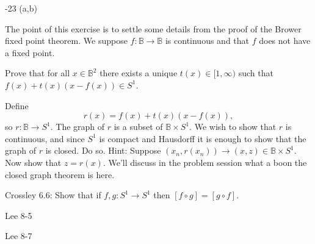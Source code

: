 \documentclass{homework651}
\newcommand{\bbB}{\mathbb{B}}
\begin{document}
\begin{problems}

-23 (a,b)

\problem The point of this exercise is to settle some details from the 
proof of the Brower fixed point theorem.  We suppose $f:\bbB\to \bbB$ is
continuous and that $f$ does not have a fixed point.
\begin{subproblems}
\item Prove that for all $x\in \bbB^2$ there exists a unique
$t(x)\in[1,\infty)$ such that $f(x)+t(x)(x-f(x))\in S^1$.
\item Define
\[
r(x) = f(x)+t(x)(x-f(x)),
\]
so $r:\bbB\to S^1$.  The graph of $r$ is a subset of $\bbB\times S^1$.  
We wish to show that $r$ is continuous, and since $S^1$ is compact and Hausdorff
it is enough to show that the graph of $r$ is closed.  Do so.  Hint:
Suppose $(x_n,r(x_n))\to (x,z)\in \bbB\times S^1$.  Now show that $z=r(x)$.
We'll discuss in the problem session what a boon the closed graph theorem is here.
\end{subproblems}

\problem Crossley 6.6: Show that if $f, g: S^1\rightarrow S^1$ then $[f\circ g] = [g\circ f]$.

\problem Lee 8-5

\problem Lee 8-7



\end{problems}
\end{document}
